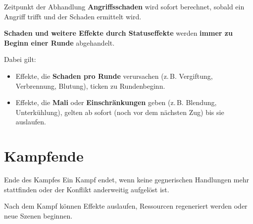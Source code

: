\begin{rulebox}{Zeitpunkt der Abhandlung}
	\textbf{Angriffsschaden} wird sofort berechnet, sobald ein Angriff trifft und der Schaden ermittelt wird.
	
	\textbf{Schaden und weitere Effekte durch Statuseffekte} werden \textbf{immer zu Beginn einer Runde} abgehandelt.
\end{rulebox}

Dabei gilt:
\begin{itemize}
	\item Effekte, die \textbf{Schaden pro Runde} verursachen (z.\,B. Vergiftung, Verbrennung, Blutung), ticken zu Rundenbeginn.
	\item Effekte, die \textbf{Mali} oder \textbf{Einschränkungen} geben (z.\,B. Blendung, Unterkühlung), gelten ab sofort (noch vor dem nächsten Zug) bis sie auslaufen.
\end{itemize}


\section{Kampfende}

\begin{rulebox}{Ende des Kampfes}
	Ein Kampf endet, wenn keine gegnerischen Handlungen mehr stattfinden oder der
	Konflikt anderweitig aufgelöst ist.
\end{rulebox}

Nach dem Kampf können Effekte auslaufen, Ressourcen regeneriert werden oder
neue Szenen beginnen.
